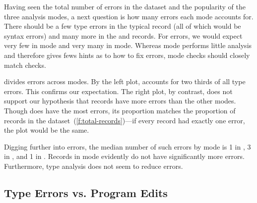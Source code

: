 \documentclass[english,submission,cleveref]{programming}
\begin{document}
Having seen the total number of errors in the dataset and the popularity of the
three analysis modes, a next question is how many errors each mode
accounts for.
There should be a few type errors in the typical \mnocheck{} record (all of
which would be syntax errors) and many more in the \mnonstrict{} and \mstrict{}
records.
For \FS{} errors, we would expect very few in \mstrict{} mode and very many in
\mnocheck{} mode.
Whereas \mnocheck{} mode performs little analysis and therefore gives fews hints
as to how to fix \FS{} errors, \mstrict{} mode checks should closely match
\FS{} checks.

 divides errors across modes.
By the left plot, \mnonstrict{} accounts for two thirds of all type errors.
This confirms our expectation.
The right plot, by contrast, does not support our hypothesis that \mnocheck{}
records have more \FS{} errors than the other modes.
Though \mnocheck{} does have the most \FS{} errors, its proportion matches
the proportion of \mnocheck{} records in the
dataset~(\cref{f:total-records})---if every record had exactly one \FS{} error,
the plot would be the same.

Digging further into \FS{} errors, the median number of such errors by mode is
1 in \mnocheck{}, 3 in \mnonstrict{}, and 1 in \mstrict{}.
Records in \mnocheck{} mode evidently do not have significantly more \FS{}
errors.
Furthermore, type analysis does not seem to reduce \FS{} errors.


\subsection{Type Errors vs. Program Edits}
\label{s:type-error-survival}
\end{document}
